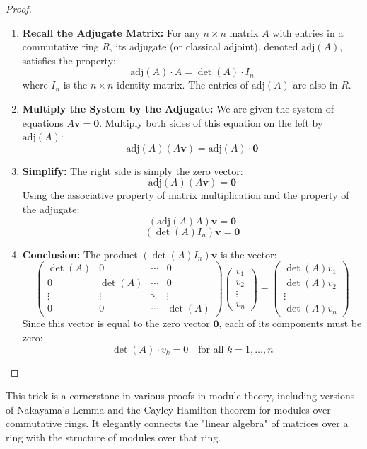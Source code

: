 \begin{proof}

\begin{enumerate}
	\item \textbf{Recall the Adjugate Matrix:} For any $n \times n$ matrix $A$ with entries in a commutative ring $R$, its adjugate (or classical adjoint), denoted $\text{adj}(A)$, satisfies the property:
\[
\text{adj}(A) \cdot A = \det(A) \cdot I_n
\]
where $I_n$ is the $n \times n$ identity matrix. The entries of $\text{adj}(A)$ are also in $R$.
	\item \textbf{Multiply the System by the Adjugate:}
We are given the system of equations $A \boldsymbol{v} = \boldsymbol{0}$.
Multiply both sides of this equation on the left by $\text{adj}(A)$:
\[
\text{adj}(A) (A \boldsymbol{v}) = \text{adj}(A) \cdot \boldsymbol{0}
\]
	\item \textbf{Simplify:}
The right side is simply the zero vector:
\[
\text{adj}(A) (A \boldsymbol{v}) = \boldsymbol{0}
\]
Using the associative property of matrix multiplication and the property of the adjugate:
\[
(\text{adj}(A) A) \boldsymbol{v} = \boldsymbol{0}
\]
\[
(\det(A) I_n) \boldsymbol{v} = \boldsymbol{0}
\]
	\item \textbf{Conclusion:}
The product $(\det(A) I_n) \boldsymbol{v}$ is the vector:
\[
\begin{pmatrix} \det(A) & 0 & \cdots & 0 \\ 0 & \det(A) & \cdots & 0 \\ \vdots & \vdots & \ddots & \vdots \\ 0 & 0 & \cdots & \det(A) \end{pmatrix} \begin{pmatrix} v_1 \\ v_2 \\ \vdots \\ v_n \end{pmatrix} = \begin{pmatrix} \det(A) v_1 \\ \det(A) v_2 \\ \vdots \\ \det(A) v_n \end{pmatrix}
\]
Since this vector is equal to the zero vector $\boldsymbol{0}$, each of its components must be zero:
\[
\det(A) \cdot v_k = 0 \quad \text{for all } k = 1, \ldots, n
\]
\end{enumerate}

\end{proof}
This trick is a cornerstone in various proofs in module theory, including versions of Nakayama's Lemma and the Cayley-Hamilton theorem for modules over commutative rings. It elegantly connects the "linear algebra" of matrices over a ring with the structure of modules over that ring.

